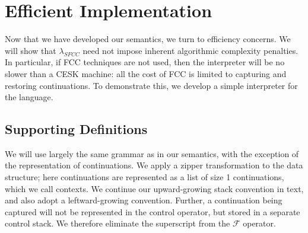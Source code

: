 \documentclass[11pt]{article}
\newcommand{\maybePage}{\newpage}
\newcommand\F{\mathcal{F}}
\begin{document}




%

\maybePage
\section{Efficient Implementation}
\label{sec:efficientImpl}

Now that we have developed our semantics, we turn to efficiency concerns.
We will show that $\lambda_{SFCC}$ need not impose inherent algorithmic complexity penalties.
In particular, if FCC techniques are not used, then the interpreter will be no slower than a CESK machine: all the cost of FCC is limited to capturing and restoring continuations.
To demonstrate this, we develop a simple interpreter for the language.

\maybePage
\subsection{Supporting Definitions}

We will use largely the same grammar as in our semantics, with the exception of the representation of continuations.
We apply a zipper transformation to the data structure; here continuations are represented as a list of size 1 continuations, which we call contexts.
We continue our upward-growing stack convention in text, and also adopt a leftward-growing convention.
Further, a continuation being captured will not be represented in the control operator, but stored in a separate control stack.
We therefore eliminate the superscript from the $\F$ operator.
\end{document}
